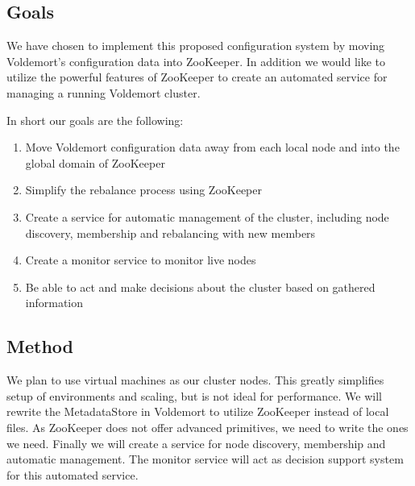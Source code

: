 \subsection{Goals}
We have chosen to implement this proposed configuration system by moving Voldemort's configuration data into ZooKeeper. In addition we would like to utilize the powerful features of ZooKeeper to create an automated service for managing a running Voldemort cluster. 


In short our goals are the following:

\begin{enumerate}
	\item{Move Voldemort configuration data away from each local node and into the global domain of ZooKeeper}
	\item{Simplify the rebalance process using ZooKeeper}
	\item{Create a service for automatic management of the cluster, including node discovery, membership and rebalancing with new members}
	\item{Create a monitor service to monitor live nodes}
	\item{Be able to act and make decisions about the cluster based on gathered information}
\end{enumerate}

\subsection{Method}
We plan to use virtual machines as our cluster nodes. This greatly simplifies setup of environments and scaling, but is not ideal for performance. We will rewrite the MetadataStore in Voldemort to utilize ZooKeeper instead of local files. As ZooKeeper does not offer advanced primitives, we need to write the ones we need. Finally we will create a service for node discovery, membership and automatic management. The monitor service will act as decision support system for this automated service. 




